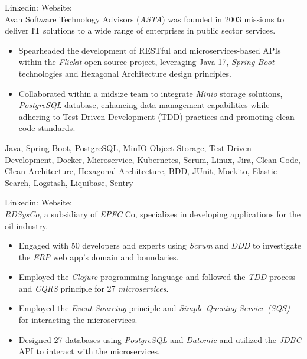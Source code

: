\begin{experiences}
{
  Linkedin: 
  Website: \\
  Avan Software Technology Advisors (\emph{ASTA}) was founded in 2003 missions to deliver IT solutions to a wide range of enterprises in public sector services.
  \begin{itemize}
    \item Spearheaded the development of RESTful and microservices-based APIs within the \emph{Flickit} open-source project, leveraging Java 17, \emph{Spring Boot} technologies and Hexagonal Architecture design principles.
    \item Collaborated within a midsize team to integrate \emph{Minio} storage solutions, \emph{PostgreSQL} database, enhancing data management capabilities while adhering to Test-Driven Development (TDD) practices and promoting clean code standards. \end{itemize}}
  {Java, Spring Boot, PostgreSQL, MinIO Object Storage, Test-Driven Development, Docker, Microservice, Kubernetes, Scrum, Linux, Jira, Clean Code, Clean Architecture, Hexagonal Architecture, BDD, JUnit, Mockito, Elastic Search, Logstash, Liquibase, Sentry} 
 \emptySeparator
{}
{
  Linkedin: 
  Website: \\
  \emph{RDSysCo}, a subsidiary of \emph{EPFC} Co, specializes in developing applications for the oil industry.
  \begin{itemize}
  \item Engaged with 50 developers and experts using \emph{Scrum} and \emph{DDD} to investigate the \textit{ERP} web app's domain and boundaries.
  \item Employed the \emph{Clojure} programming language and followed the \emph{TDD} process and \textit{CQRS} principle for 27 \emph{microservices}.
  \item Employed the \textit{Event Sourcing} principle and \textit{Simple Queuing Service (SQS)} for interacting the microservices.
  \item Designed 27 databases using \emph{PostgreSQL} and \emph{Datomic} and utilized the \emph{JDBC} API to interact with the microservices.

\end{itemize}}
\end{experiences}
